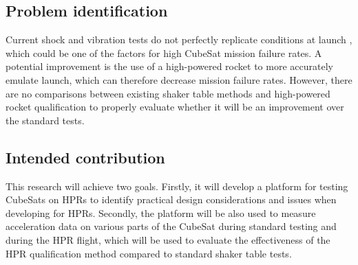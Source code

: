\documentclass[a4paper,11pt]{article}
\begin{document}
\subsection{Problem identification}
Current shock and vibration tests do not perfectly replicate conditions at launch \cite{gordon2015benefits,nath2022study}, which could be one of the factors for high CubeSat mission failure rates. A potential improvement is the use of a high-powered rocket to more accurately emulate launch, which can therefore decrease mission failure rates. However, there are no comparisons between existing shaker table methods and high-powered rocket qualification to properly evaluate whether it will be an improvement over the standard tests.

\subsection{Intended contribution}

This research will achieve two goals. Firstly, it will develop a platform for testing CubeSats on HPRs to identify practical design considerations and issues when developing for HPRs. Secondly, the platform will be also used to measure acceleration data on various parts of the CubeSat during standard testing and during the HPR flight, which will be used to evaluate the effectiveness of the HPR qualification method compared to standard shaker table tests.



\end{document}
